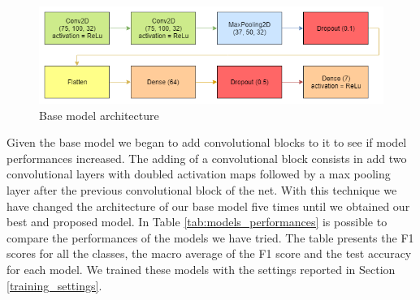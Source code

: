 		\begin{figure}[H]
			\centering
			\includegraphics[width=15cm]{images/base_model.png}
			\caption{Base model architecture}
			\label{fig:base_model}
		\end{figure}
	
		Given the base model we began to add convolutional blocks to it to see if model performances increased. The adding of a convolutional block consists in add two convolutional layers with doubled activation maps followed by a max pooling layer after the previous convolutional block of the net. With this technique we have changed the architecture of our base model five times until we obtained our best and proposed model. In Table \ref{tab:models_performances} is possible to compare the performances of the models we have tried. The table presents the F1 scores for all the classes, the macro average of the F1 score and the test accuracy for each model. We trained these models with the settings reported in Section \ref{training_settings}.
		
